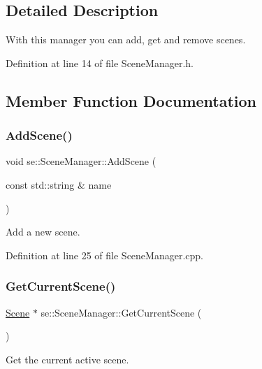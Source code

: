 \subsection{Detailed Description}
With this manager you can add, get and remove scenes. 

Definition at line 14 of file Scene\+Manager.\+h.



\subsection{Member Function Documentation}
\mbox{\label{classse_1_1_scene_manager_a9ad26f193f547285f4eae5c440f24a10}} 
\subsubsection{\texorpdfstring{Add\+Scene()}{AddScene()}}
{\footnotesize\ttfamily void se\+::\+Scene\+Manager\+::\+Add\+Scene (\begin{DoxyParamCaption}\item[{const std\+::string \&}]{name }\end{DoxyParamCaption})}

Add a new scene. 

Definition at line 25 of file Scene\+Manager.\+cpp.

\mbox{\label{classse_1_1_scene_manager_aee24906248f3b7cb63df4c7411791dc0}} 
\subsubsection{\texorpdfstring{Get\+Current\+Scene()}{GetCurrentScene()}}
{\footnotesize\ttfamily \mbox{\hyperlink{classse_1_1_scene}{Scene}} $\ast$ se\+::\+Scene\+Manager\+::\+Get\+Current\+Scene (\begin{DoxyParamCaption}{ }\end{DoxyParamCaption})\hspace{0.3cm}{\ttfamily [static]}}

Get the current active scene. 

